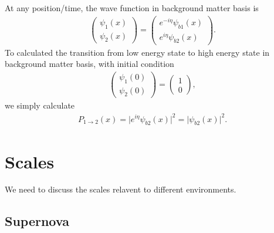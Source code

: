 \documentclass[letterpaper,12pt,english]{sphinxmanual}
\begin{document}
At any position/time, the wave function in background matter basis is
\label{\detokenize{matter-stimulated/index:matter-stimulated-equation-wavefunction-diff-basis}}\label{\detokenize{matter-stimulated/index:equation-wavefunction-diff-basis}}\begin{equation}\label{equation:matter-stimulated/index:wavefunction-diff-basis}
\begin{split}\begin{pmatrix} \psi_1 (x) \\ \psi_2(x)  \end{pmatrix} = \begin{pmatrix} e^{- i \eta} \psi_{b1} (x) \\ e^{i\eta} \psi_{b2} (x)  \end{pmatrix}.\end{split}
\end{equation}
To calculated the transition from low energy state to high energy state in background matter basis, with initial condition
\begin{equation*}
\begin{split}\begin{pmatrix} \psi_1 (0) \\ \psi_2(0)  \end{pmatrix} = \begin{pmatrix} 1 \\ 0  \end{pmatrix},\end{split}
\end{equation*}
we simply calculate
\begin{equation*}
\begin{split}P_{1 \to 2} (x) = \lvert e^{i\eta} \psi_{b2} (x)  \rvert^2 = \lvert \psi_{b2} (x)  \rvert^2 .\end{split}
\end{equation*}

\section{Scales}
\label{\detokenize{matter-stimulated/scales::doc}}\label{\detokenize{matter-stimulated/scales:scales}}
We need to discuss the scales relavent to different environments.


\subsection{Supernova}
\label{\detokenize{matter-stimulated/scales:supernova}}
\end{document}
